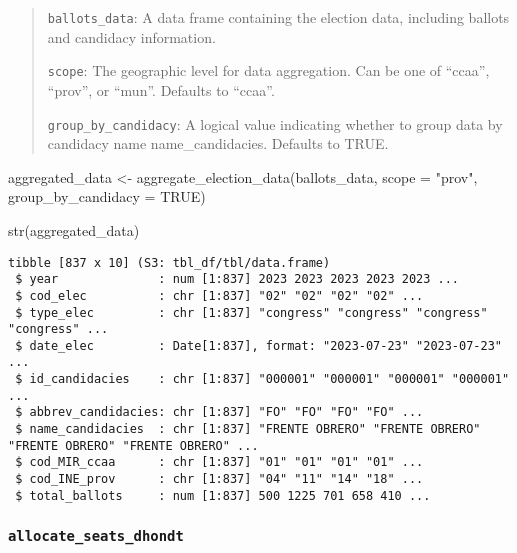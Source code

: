 \documentclass[
  letterpaper,
  DIV=11,
  numbers=noendperiod]{scrreprt}
\newenvironment{Shaded}{\begin{snugshade}}{\end{snugshade}}
\newcommand{\AttributeTok}[1]{\textcolor[rgb]{0.40,0.45,0.13}{#1}}
\newcommand{\ConstantTok}[1]{\textcolor[rgb]{0.56,0.35,0.01}{#1}}
\newcommand{\FunctionTok}[1]{\textcolor[rgb]{0.28,0.35,0.67}{#1}}
\newcommand{\NormalTok}[1]{\textcolor[rgb]{0.00,0.23,0.31}{#1}}
\newcommand{\OtherTok}[1]{\textcolor[rgb]{0.00,0.23,0.31}{#1}}
\newcommand{\StringTok}[1]{\textcolor[rgb]{0.13,0.47,0.30}{#1}}
\begin{document}
\begin{quote}
\texttt{ballots\_data}: A data frame containing the election data,
including ballots and candidacy information.

\texttt{scope}: The geographic level for data aggregation. Can be one of
``ccaa'', ``prov'', or ``mun''. Defaults to ``ccaa''.

\texttt{group\_by\_candidacy}: A logical value indicating whether to
group data by candidacy name name\_candidacies. Defaults to TRUE.
\end{quote}

\begin{Shaded}
\begin{Highlighting}[]
\NormalTok{aggregated\_data }\OtherTok{\textless{}{-}} \FunctionTok{aggregate\_election\_data}\NormalTok{(ballots\_data, }
                                           \AttributeTok{scope =} \StringTok{"prov"}\NormalTok{,}
                                           \AttributeTok{group\_by\_candidacy =} \ConstantTok{TRUE}\NormalTok{)}
\end{Highlighting}
\end{Shaded}

\begin{Shaded}
\begin{Highlighting}[]
\FunctionTok{str}\NormalTok{(aggregated\_data)}
\end{Highlighting}
\end{Shaded}

\begin{verbatim}
tibble [837 x 10] (S3: tbl_df/tbl/data.frame)
 $ year              : num [1:837] 2023 2023 2023 2023 2023 ...
 $ cod_elec          : chr [1:837] "02" "02" "02" "02" ...
 $ type_elec         : chr [1:837] "congress" "congress" "congress" "congress" ...
 $ date_elec         : Date[1:837], format: "2023-07-23" "2023-07-23" ...
 $ id_candidacies    : chr [1:837] "000001" "000001" "000001" "000001" ...
 $ abbrev_candidacies: chr [1:837] "FO" "FO" "FO" "FO" ...
 $ name_candidacies  : chr [1:837] "FRENTE OBRERO" "FRENTE OBRERO" "FRENTE OBRERO" "FRENTE OBRERO" ...
 $ cod_MIR_ccaa      : chr [1:837] "01" "01" "01" "01" ...
 $ cod_INE_prov      : chr [1:837] "04" "11" "14" "18" ...
 $ total_ballots     : num [1:837] 500 1225 701 658 410 ...
\end{verbatim}

\hypertarget{allocate_seats_dhondt}{%
\subsubsection{\texorpdfstring{\texttt{allocate\_seats\_dhondt}}{allocate\_seats\_dhondt}}\label{allocate_seats_dhondt}}
\end{document}
